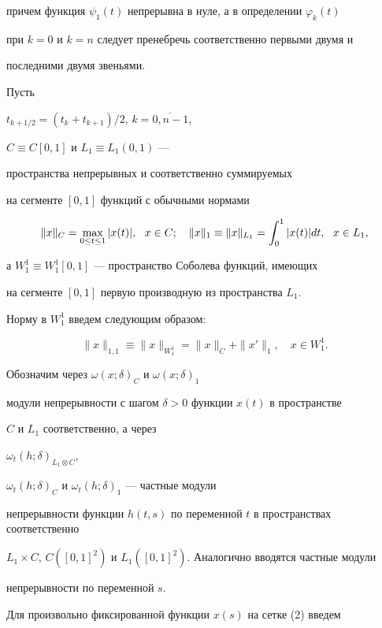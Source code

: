 причем функция $\psi_1(t)$ непрерывна в нуле, а в определении $\varphi_k(t)$


при $k=0$ и $k=n$ следует пренебречь соответственно первыми двумя и


последними двумя звеньями.





Пусть


$t_{k+1/2}=(t_k+t_{k+1})/2$, $k=\overline{0,n-1}$,


$C\equiv C[0,1]$ и $L_1\equiv L_1(0,1)$ ---


пространства непрерывных и соответственно суммируемых


на сегменте $[0,1]$ функций с обычными нормами


$$


\|x\|_C =\max_{0\leq t\leq 1}|x(t)|,\ \ 


x\in C;\quad \|x\|_1\equiv \|x\|_\aL =\int_0^1|x(t)|dt,\ \ x\in L_1,


$$


а $W_1^1\equiv W_1^1[0,1]$ --- пространство Соболева функций, имеющих


на сегменте $[0,1]$ первую производную из пространства $L_1$.


Норму в $W_1^1$ введем следующим образом:


$$


\|x\|_{1,1}\equiv \|x\|_{W_1^1} =\|x\|_C +\|x'\|_1,\quad x\in W_1^1.


$$





Обозначим через $\omega(x;\delta)_C$ и $\omega(x;\delta)_1$


модули непрерывности с шагом $\delta >0$ функции $x(t)$ в пространстве


$C$ и $L_1$ соответственно, а через 


$\omega_t(h;\delta)_{L_1\otimes C}$,


$\omega_t(h;\delta)_C$ и $\omega_t(h;\delta)_1$ --- частные модули


непрерывности функции $h(t,s)$ по переменной $t$ в пространствах соответственно


$L_1\times C$, $C([0,1]^2)$ и $L_1([0,1]^2)$. Аналогично вводятся частные модули


непрерывности по переменной $s$.





Для произвольно фиксированной функции $x(s)$ на сетке (2) введем 


